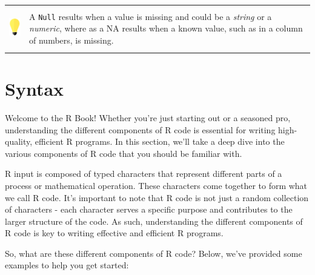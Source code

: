 \documentclass[
]{book}
\begin{document}
\hfill\break

\begin{longtable}[]{@{}
  >{\raggedright\arraybackslash}p{}
  >{\raggedright\arraybackslash}p{}@{}}
\toprule\noalign{}
\endhead
\bottomrule\noalign{}
\endlastfoot
\includegraphics[width=\textwidth,height=0.70833in]{images/01.png} & A \texttt{Null} results when a value is missing and could be a \emph{string} or a \emph{numeric}, where as a NA results when a known value, such as in a column of numbers, is missing. \textbar{} \\
\end{longtable}

\hfill\break

\hypertarget{syntax}{%
\section{Syntax}\label{syntax}}

Welcome to the R Book! Whether you're just starting out or a seasoned pro, understanding the different components of R code is essential for writing high-quality, efficient R programs. In this section, we'll take a deep dive into the various components of R code that you should be familiar with.

R input is composed of typed characters that represent different parts of a process or mathematical operation. These characters come together to form what we call R code. It's important to note that R code is not just a random collection of characters - each character serves a specific purpose and contributes to the larger structure of the code. As such, understanding the different components of R code is key to writing effective and efficient R programs.

So, what are these different components of R code? Below, we've provided some examples to help you get started:
\end{document}
